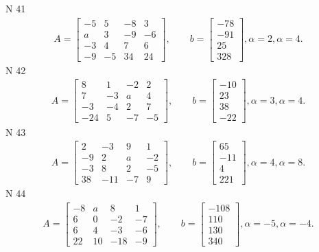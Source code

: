 \documentclass[11pt]{report}
\begin{document}
N 41
\begin{align*}
 A = \left[\begin{matrix}-5 & 5 & -8 & 3\\a & 3 & -9 & -6\\-3 & 4 & 7 & 6\\-9 & -5 & 34 & 24\end{matrix}\right],
    \qquad b = \left[\begin{matrix}-78\\-91\\25\\328\end{matrix}\right], \alpha = 2, \alpha = 4. 
 \end{align*}
N 42
\begin{align*}
 A = \left[\begin{matrix}8 & 1 & -2 & 2\\7 & -3 & a & 4\\-3 & -4 & 2 & 7\\-24 & 5 & -7 & -5\end{matrix}\right],
    \qquad b = \left[\begin{matrix}-10\\23\\38\\-22\end{matrix}\right], \alpha = 3, \alpha = 4. 
 \end{align*}
N 43
\begin{align*}
 A = \left[\begin{matrix}2 & -3 & 9 & 1\\-9 & 2 & a & -2\\-3 & 8 & 2 & -5\\38 & -11 & -7 & 9\end{matrix}\right],
    \qquad b = \left[\begin{matrix}65\\-11\\4\\221\end{matrix}\right], \alpha = 4, \alpha = 8. 
 \end{align*}
N 44
\begin{align*}
 A = \left[\begin{matrix}-8 & a & 8 & 1\\6 & 0 & -2 & -7\\6 & 4 & -3 & -6\\22 & 10 & -18 & -9\end{matrix}\right],
    \qquad b = \left[\begin{matrix}-108\\110\\130\\340\end{matrix}\right], \alpha = -5, \alpha = -4. 
 \end{align*}
\end{document}

